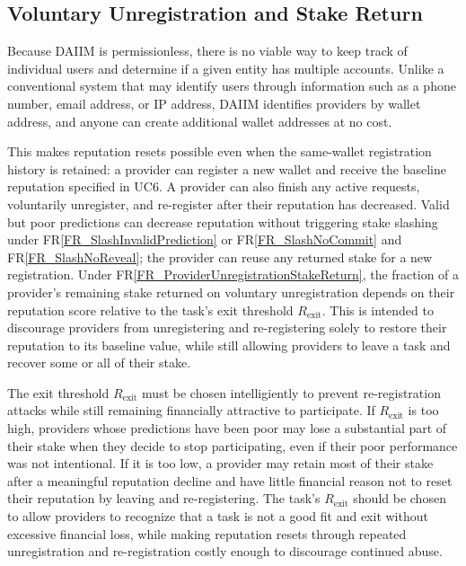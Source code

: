 \documentclass[12pt]{article}
\newcommand{\rref}[1]{FR\ref{#1}}
\begin{document}
\subsection{Voluntary Unregistration and Stake Return}

Because DAIIM is permissionless, there is no viable way to keep track of individual
users and determine if a given entity has multiple accounts. Unlike a
conventional system that may identify users through information such as a phone
number, email address, or IP address, DAIIM identifies providers by wallet
address, and anyone can create additional wallet addresses at no cost.

This makes reputation resets possible even when the same-wallet registration
history is retained: a provider can register a new wallet and receive the
baseline reputation specified in UC6. A provider can also finish any active
requests, voluntarily unregister, and re-register after their reputation has
decreased. Valid but poor predictions can decrease reputation without
triggering stake slashing under \rref{FR_SlashInvalidPrediction} or
\rref{FR_SlashNoCommit} and \rref{FR_SlashNoReveal}; the provider can reuse any returned stake for a new
registration. Under \rref{FR_ProviderUnregistrationStakeReturn}, the fraction of a provider's
remaining stake returned on voluntary unregistration depends on their reputation
score relative to the task's exit threshold $R_{\text{exit}}$. This is intended
to discourage providers from unregistering and re-registering solely to restore their
reputation to its baseline value, while still allowing providers to leave a task
and recover some or all of their stake.

The exit threshold $R_{\text{exit}}$ must be chosen intelligiently to prevent re-registration
attacks while still remaining financially attractive to participate.
If $R_{\text{exit}}$ is too high,
providers whose predictions have been poor may lose a substantial part of
their stake when they decide to stop participating, even if their poor
performance was not intentional. If it is too low, a provider may retain most
of their stake after a meaningful reputation decline and have little financial
reason not to reset their reputation by leaving and re-registering. The task's
$R_{\text{exit}}$ should be chosen to allow providers to recognize
that a task is not a good fit and exit without excessive financial loss, while
making reputation resets through repeated unregistration and re-registration
costly enough to discourage continued abuse.
\end{document}
